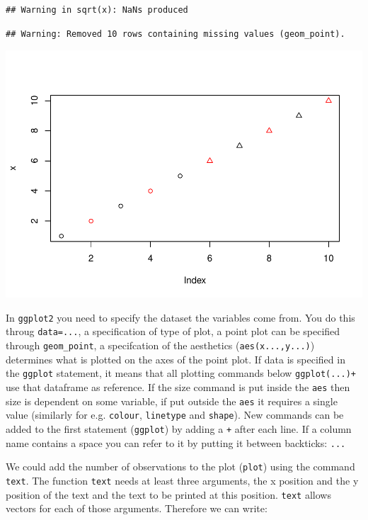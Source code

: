 \documentclass[11pt,]{article}
\begin{document}
\begin{verbatim}
## Warning in sqrt(x): NaNs produced
\end{verbatim}

\begin{verbatim}
## Warning: Removed 10 rows containing missing values (geom_point).
\end{verbatim}

\includegraphics{Lab_2_modified_files/figure-latex/unnamed-chunk-41-1.pdf}

In \texttt{ggplot2} you need to specify the dataset the variables come
from. You do this throug \texttt{data=...}, a specification of type of
plot, a point plot can be specified through \texttt{geom\_point}, a
specifcation of the aesthetics (\texttt{aes(x...,y...)}) determines what
is plotted on the axes of the point plot. If data is specified in the
\texttt{ggplot} statement, it means that all plotting commands below
\texttt{ggplot(...)+} use that dataframe as reference. If the size
command is put inside the \texttt{aes} then size is dependent on some
variable, if put outside the \texttt{aes} it requires a single value
(similarly for e.g. \texttt{colour}, \texttt{linetype} and
\texttt{shape}). New commands can be added to the first statement
(\texttt{ggplot}) by adding a \texttt{+} after each line. If a column
name contains a space you can refer to it by putting it between
backticks: \texttt{...}

We could add the number of observations to the plot (\texttt{plot})
using the command \texttt{text}. The function \texttt{text} needs at
least three arguments, the x position and the y position of the text and
the text to be printed at this position. \texttt{text} allows vectors
for each of those arguments. Therefore we can write:
\end{document}
